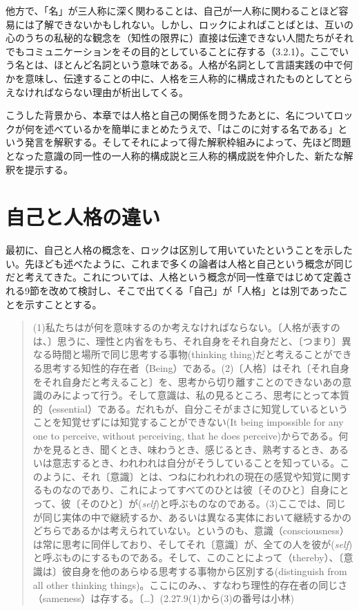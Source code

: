 \documentclass[a4j,oneside]{jsbook}
\begin{document}
他方で、「名」が三人称に深く関わることは、自己が一人称に関わることほど容易には了解できないかもしれない。しかし、ロックによればことばとは、互いの心のうちの私秘的な観念を（知性の限界に）直接は伝達できない人間たちがそれでもコミュニケーションをその目的としていることに存する（3.2.1）。ここでいう名とは、ほとんど名詞という意味である。人格が名詞として言語実践の中で何かを意味し、伝達することの中に、人格を三人称的に構成されたものとしてとらえなければならない理由が析出してくる。
\par
こうした背景から、本章では人格と自己の関係を問うたあとに、名についてロックが何を述べているかを簡単にまとめたうえで、「はこのに対する名である」という発言を解釈する。そしてそれによって得た解釈枠組みによって、先ほど問題となった意識の同一性の一人称的構成説と三人称的構成説を仲介した、新たな解釈を提示する。
\section{
自己と人格の違い
}
最初に、自己と人格の概念を、ロックは区別して用いていたということを示したい。先ほども述べたように、これまで多くの論者は人格と自己という概念が同じだと考えてきた。これについては、人格という概念が同一性章ではじめて定義される9節を改めて検討し、そこで出てくる「自己」が「人格」とは別であったことを示すこととする。
\begin{quote}
(1)私たちはが何を意味するのか考えなければならない。〔人格が表すのは、〕思うに、理性と内省をもち、それ自身をそれ自身だと、〔つまり〕異なる時間と場所で同じ思考する事物(thinking thing)だと考えることができる思考する知性的存在者（Being）である。(2)〔人格〕はそれ〔それ自身をそれ自身だと考えること〕を、思考から切り離すことのできないあの意識のみによって行う。そして意識は、私の見るところ、思考にとって本質的（essential）である。だれもが、自分こそがまさに知覚しているということを知覚せずには知覚することができない(It being impossible for any one to perceive, without perceiving, that he does perceive)からである。何かを見るとき、聞くとき、味わうとき、感じるとき、熟考するとき、あるいは意志するとき、われわれは自分がそうしていることを知っている。このように、それ〔意識〕とは、つねにわれわれの現在の感覚や知覚に関するものなのであり、これによってすべてのひとは彼〔そのひと〕自身にとって、彼〔そのひと〕が({\itshape self})と呼ぶものなのである。(3)ここでは、同じが同じ実体の中で継続するか、あるいは異なる実体において継続するかのどちらであるかは考えられていない。というのも、意識（consciousness）は常に思考に同伴しており、そしてそれ〔意識〕が、全ての人を彼が({\itshape self})と呼ぶものにするものである。そして、このことによって（thereby）、〔意識は〕彼自身を他のあらゆる思考する事物から区別する(distinguish from all other thinking things)。ここにのみ、、すなわち理性的存在者の同じさ（sameness）は存する。〔…〕(2.27.9(1)から(3)の番号は小林)
\end{quote}
\end{document}
